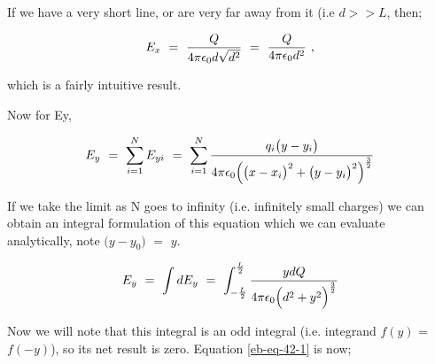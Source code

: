 \documentclass{article}
\begin{document}
If we have a very short line, or are very far away from it (i.e \begin{math} d >> L \end{math}, then;

\begin{equation} \label{eb-eq-40-1}
E_{x} \hspace{0.125cm} = \hspace{0.125cm} \frac{Q}{4\pi \epsilon_{0} d \sqrt{d^2}} \hspace{0.125cm} = \hspace{0.125cm} \frac{Q}{4\pi \epsilon_{0} d^{2}} \hspace{0.125cm} , 
\end{equation}

which is a fairly intuitive result. 

Now for Ey, 

\begin{equation} \label{eb-eq-41-1}
E_{y} \hspace{0.125cm} = \hspace{0.125cm} \sum_{i=1}^{N} E_{yi} \hspace{0.125cm} = \hspace{0.125cm} \sum_{i=1}^{N} \frac{q_{i}\big(y - y_{i}\big)}{4\pi \epsilon_{0} \Big( \big(x - x_{i}\big)^2 + \big(y - y_{i}\big)^2 \Big)^{\frac{3}{2}}}
\end{equation}

If we take the limit as N goes to infinity (i.e. infinitely small charges) we can obtain an integral formulation of this equation which we can evaluate analytically, note \begin{math} \big(y - y_0\big) \end{math} \begin{math} = \end{math} \begin{math} y \end{math}. 

\begin{equation} \label{eb-eq-42-1}
E_y \hspace{0.125cm} = \hspace{0.125cm} \int dE_{y} \hspace{0.125cm} = \hspace{0.125cm} \int_{-\frac{L}{2}}^{\frac{L}{2}} \frac{y dQ }{4\pi \epsilon_{0} \Big( d^2 + y^2 \Big)^{\frac{3}{2}}}
\end{equation}

Now we will note that this integral is an odd integral (i.e. integrand \begin{math} f(y) \end{math} = \begin{math} f(-y) \end{math}), so its net result is zero. Equation \ref{eb-eq-42-1} is now;
\end{document}

